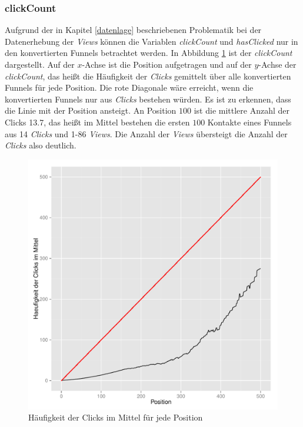 \subsubsection*{clickCount}
Aufgrund der in Kapitel \ref{datenlage} beschriebenen Problematik bei der Datenerhebung der \textit{Views} können die Variablen \textit{clickCount} und \textit{hasClicked} nur in den konvertierten Funnels betrachtet werden. In Abbildung \ref{clickCount} ist der \textit{clickCount} dargestellt. Auf der $x$-Achse ist die Position aufgetragen und auf der $y$-Achse der \textit{clickCount}, das heißt die Häufigkeit der \textit{Clicks} gemittelt über alle konvertierten Funnels für jede Position. Die rote Diagonale wäre erreicht, wenn die konvertierten Funnels nur aus \textit{Clicks} bestehen würden. Es ist zu erkennen, dass die Linie mit der Position ansteigt. An Position $100$ ist die mittlere Anzahl der Clicks 13.7, das heißt im Mittel bestehen die ersten $100$ Kontakte eines Funnels aus 14 \textit{Clicks} und 1-86 \textit{Views}. Die Anzahl der \textit{Views} übersteigt die Anzahl der \textit{Clicks} also deutlich.
\begin{figure}[H]
    \centering
    \includegraphics[scale=0.5]{clickCountSucc.pdf}
    \caption{Häufigkeit der Clicks im Mittel für jede Position}
    \label{clickCount}
\end{figure}

